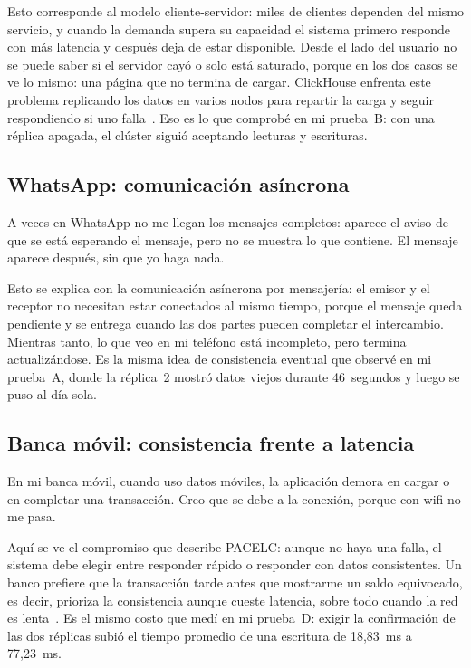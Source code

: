 \documentclass[12pt,a4paper]{article}
\begin{document}
Esto corresponde al modelo cliente-servidor: miles de clientes dependen
del mismo servicio, y cuando la demanda supera su capacidad el sistema
primero responde con más latencia y después deja de estar disponible.
Desde el lado del usuario no se puede saber si el servidor cayó o solo
está saturado, porque en los dos casos se ve lo mismo: una página que
no termina de cargar. ClickHouse enfrenta este problema replicando los
datos en varios nodos para repartir la carga y seguir respondiendo si
uno falla~\cite{schulze2024}. Eso es lo que comprobé en mi prueba~B: con
una réplica apagada, el clúster siguió aceptando lecturas y escrituras.

\subsection{WhatsApp: comunicación asíncrona}
A veces en WhatsApp no me llegan los mensajes completos: aparece el
aviso de que se está esperando el mensaje, pero no se muestra lo que
contiene. El mensaje aparece después, sin que yo haga nada.

Esto se explica con la comunicación asíncrona por mensajería: el emisor
y el receptor no necesitan estar conectados al mismo tiempo, porque el
mensaje queda pendiente y se entrega cuando las dos partes pueden
completar el intercambio. Mientras tanto, lo que veo en mi teléfono está
incompleto, pero termina actualizándose. Es la misma idea de
consistencia eventual que observé en mi prueba~A, donde la réplica~2
mostró datos viejos durante 46~segundos y luego se puso al día sola.

\subsection{Banca móvil: consistencia frente a latencia}
En mi banca móvil, cuando uso datos móviles, la aplicación demora en
cargar o en completar una transacción. Creo que se debe a la conexión,
porque con wifi no me pasa.

Aquí se ve el compromiso que describe PACELC: aunque no haya una falla,
el sistema debe elegir entre responder rápido o responder con datos
consistentes. Un banco prefiere que la transacción tarde antes que
mostrarme un saldo equivocado, es decir, prioriza la consistencia aunque
cueste latencia, sobre todo cuando la red es lenta~\cite{ferreira2024}.
Es el mismo costo que medí en mi prueba~D: exigir la confirmación de las
dos réplicas subió el tiempo promedio de una escritura de 18,83~ms a
77,23~ms.
\end{document}

